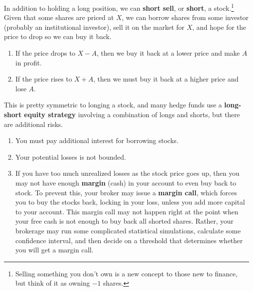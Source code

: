 \documentclass{article}
\begin{document}
    \begin{definition}
      In addition to holding a long position, we can \textbf{short sell}, or \textbf{short}, a stock.\footnote{Selling something you don't own is a new concept to those new to finance, but think of it as owning $-1$ shares. } Given that some shares are priced at $X$, we can borrow shares from some investor (probably an institutional investor), sell it on the market for $X$, and hope for the price to drop so we can buy it back. 
      \begin{enumerate}
        \item If the price drops to $X - A$, then we buy it back at a lower price and make $A$ in profit. 
        \item If the price rises to $X + A$, then we must buy it back at a higher price and lose $A$. 
      \end{enumerate}
    \end{definition}

    This is pretty symmetric to longing a stock, and many hedge funds use a \textbf{long-short equity strategy} involving a combination of longs and shorts, but there are additional risks. 
    \begin{enumerate}
      \item You must pay additional interest for borrowing stocks. 

      \item Your potential losses is not bounded. 

      \item If you have too much unrealized losses as the stock price goes up, then you may not have enough \textbf{margin} (cash) in your account to even buy back to stock. To prevent this, your broker may issue a \textbf{margin call}, which forces you to buy the stocks back, locking in your loss, unless you add more capital to your account. This margin call may not happen right at the point when your free cash is not enough to buy back all shorted shares. Rather, your brokerage may run some complicated statistical simulations, calculate some confidence interval, and then decide on a threshold that determines whether you will get a margin call. 
    \end{enumerate}
\end{document}
